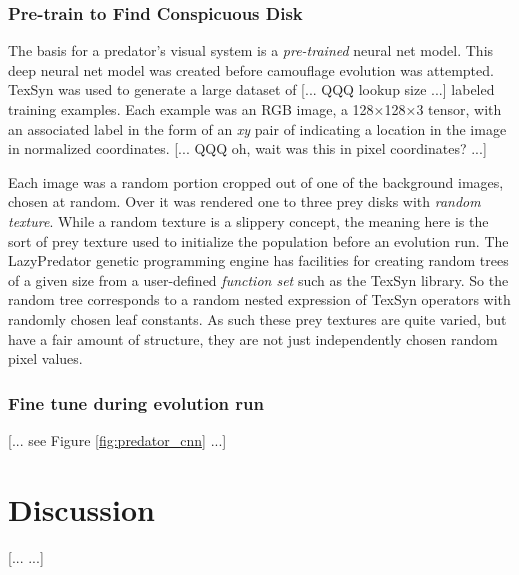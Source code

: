 \documentclass[sigconf]{acmart}
\newcommand{\jargon}[1]{\textit{#1}}
\begin{document}
\subsubsection{Pre-train to Find Conspicuous Disk}
The basis for a predator's visual system is a \jargon{pre-trained} neural net model. This deep neural net model was created before camouflage evolution was attempted. TexSyn was used to generate a large dataset of [... QQQ lookup size ...] labeled training examples. Each example was an RGB image, a 128×128×3 tensor, with an associated label in the form of an \textit{xy} pair of indicating a location in the image in normalized coordinates. [... QQQ oh, wait was this in pixel coordinates? ...]
\par
Each image was a random portion cropped out of one of the background images, chosen at random. Over it was rendered one to three prey disks with \jargon{random texture}. While a random texture is a slippery concept, the meaning here is the sort of prey texture used to initialize the population before an evolution run. The LazyPredator genetic programming engine has facilities for creating random trees of a given size from a user-defined \jargon{function set} such as the TexSyn library. So the random tree corresponds to a random nested expression of TexSyn operators with randomly chosen leaf constants. As such these prey textures are quite varied, but have a fair amount of structure, they are not just independently chosen random pixel values.

\subsubsection{Fine tune during evolution run}
[... see Figure \ref{fig:predator_cnn} ...]


\section{Discussion}
[... ...]

\end{document}
